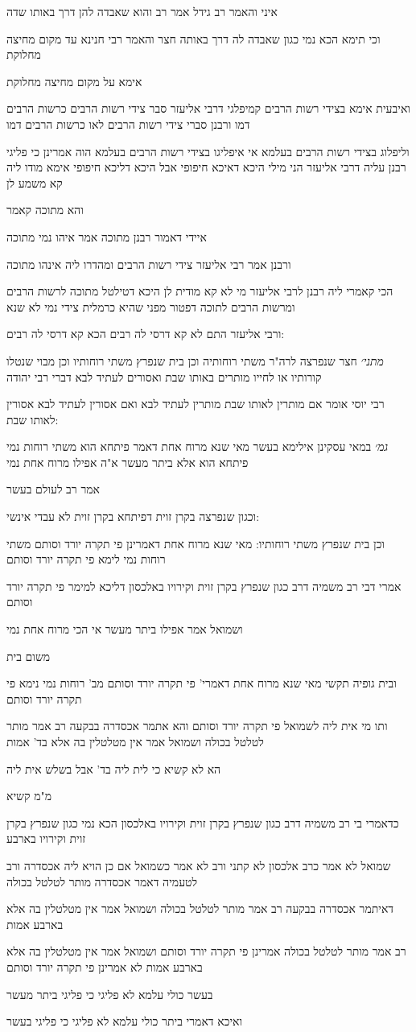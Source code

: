 \documentclass[12pt, openany]{book}
\newcommand{\sethebfont}{
\fontsize{10.5pt}{21.0pt} \selectfont
}
\newcommand{\textblock}[1]{
{\sethebfont #1\\}	
}
\begin{document}
\textblock{איני והאמר רב גידל אמר רב והוא שאבדה להן דרך באותו שדה}
\textblock{וכי תימא הכא נמי כגון שאבדה לה דרך באותה חצר והאמר רבי חנינא עד מקום מחיצה מחלוקת}
\textblock{אימא על מקום מחיצה מחלוקת}
\textblock{ואיבעית אימא בצידי רשות הרבים קמיפלגי דרבי אליעזר סבר צידי רשות הרבים כרשות הרבים דמו ורבנן סברי צידי רשות הרבים לאו כרשות הרבים דמו}
\textblock{וליפלוג בצידי רשות הרבים בעלמא אי איפליגו בצידי רשות הרבים בעלמא הוה אמרינן כי פליגי רבנן עליה דרבי אליעזר הני מילי היכא דאיכא חיפופי אבל היכא דליכא חיפופי אימא מודו ליה קא משמע לן}
\textblock{והא מתוכה קאמר}
\textblock{איידי דאמור רבנן מתוכה אמר איהו נמי מתוכה}
\textblock{ורבנן אמר רבי אליעזר צידי רשות הרבים ומהדרו ליה אינהו מתוכה}
\textblock{הכי קאמרי ליה רבנן לרבי אליעזר מי לא קא מודית לן היכא דטילטל מתוכה לרשות הרבים ומרשות הרבים לתוכה דפטור מפני שהיא כרמלית צידי נמי לא שנא}
\textblock{ורבי אליעזר התם לא קא דרסי לה רבים הכא קא דרסי לה רבים:}
\textblock{{\large\emph{מתני׳}} חצר שנפרצה לרה"ר משתי רוחותיה וכן בית שנפרץ משתי רוחותיו וכן מבוי שנטלו קורותיו או לחייו מותרים באותו שבת ואסורים לעתיד לבא דברי רבי יהודה}
\textblock{רבי יוסי אומר אם מותרין לאותו שבת מותרין לעתיד לבא ואם אסורין לעתיד לבא אסורין לאותו שבת:}
\textblock{{\large\emph{גמ׳}} במאי עסקינן אילימא בעשר מאי שנא מרוח אחת דאמר פיתחא הוא משתי רוחות נמי פיתחא הוא אלא ביתר מעשר א"ה אפילו מרוח אחת נמי}
\textblock{אמר רב לעולם בעשר}
\textblock{וכגון שנפרצה בקרן זוית דפיתחא בקרן זוית לא עבדי אינשי:}
\textblock{וכן בית שנפרץ משתי רוחותיו: מאי שנא מרוח אחת דאמרינן פי תקרה יורד וסותם משתי רוחות נמי לימא פי תקרה יורד וסותם}
\textblock{אמרי דבי רב משמיה דרב כגון שנפרץ בקרן זוית וקירויו באלכסון דליכא למימר פי תקרה יורד וסותם}
\textblock{ושמואל אמר אפילו ביתר מעשר אי הכי מרוח אחת נמי}
\textblock{משום בית}
\textblock{ובית גופיה תקשי מאי שנא מרוח אחת דאמרי' פי תקרה יורד וסותם מב' רוחות נמי נימא פי תקרה יורד וסותם}
\textblock{ותו מי אית ליה לשמואל פי תקרה יורד וסותם והא אתמר אכסדרה בבקעה רב אמר מותר לטלטל בכולה ושמואל אמר אין מטלטלין בה אלא בד' אמות}
\textblock{הא לא קשיא כי לית ליה בד' אבל בשלש אית ליה}
\textblock{מ"מ קשיא}
\textblock{כדאמרי בי רב משמיה דרב כגון שנפרץ בקרן זוית וקירויו באלכסון הכא נמי כגון שנפרץ בקרן זוית וקירויו בארבע}
\textblock{שמואל לא אמר כרב אלכסון לא קתני ורב לא אמר כשמואל אם כן הויא ליה אכסדרה ורב לטעמיה דאמר אכסדרה מותר לטלטל בכולה}
\textblock{דאיתמר אכסדרה בבקעה רב אמר מותר לטלטל בכולה ושמואל אמר אין מטלטלין בה אלא בארבע אמות}
\textblock{רב אמר מותר לטלטל בכולה אמרינן פי תקרה יורד וסותם ושמואל אמר אין מטלטלין בה אלא בארבע אמות לא אמרינן פי תקרה יורד וסותם}
\textblock{בעשר כולי עלמא לא פליגי כי פליגי ביתר מעשר}
\textblock{ואיכא דאמרי ביתר כולי עלמא לא פליגי כי פליגי בעשר}
\end{document}
